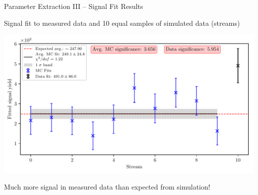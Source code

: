 \documentclass[serif]{beamer}
\begin{document}

\begin{frame}[t]{Parameter Extraction III -- Signal Fit Results}
\vspace{-3mm}
\small

Signal fit to measured data and 10 equal samples of simulated data (streams)
\vspace{-2mm}
\begin{center}
	\includegraphics[width=\textwidth]{fig/sig_global}
\end{center}

\textcolor{turtlegreen}{Much more signal in measured data than expected from simulation!}	

\end{frame}

\end{document}
